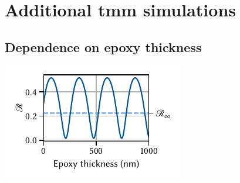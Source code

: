 \chapter{Additional \texorpdfstring{\acrshort{tmm}}{TMM} simulations}\label{ch:app:exp:tmm}
\section{Dependence on epoxy thickness}\label{sec:app:exp:tmm:epoxy}

\begin{marginfigure}
    \centering
    \includegraphics{img/pdf/experiment/reflectance_epoxy}
    \caption[]{}
    \label{fig:app:exp:tmm:epoxy}
\end{marginfigure}

